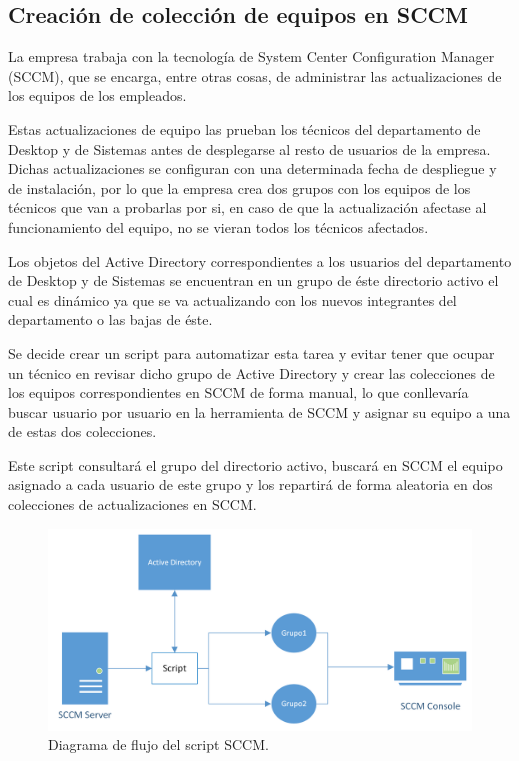 \documentclass[a4paper, 12pt]{book}
\begin{document}
\subsection{Creación de colección de equipos en SCCM}
\label{Creación de colección de equipos en SCCM}

La empresa trabaja con la tecnología de System Center Configuration Manager (SCCM), que se encarga, entre otras cosas, de administrar las actualizaciones de los equipos de los empleados.

Estas actualizaciones de equipo las prueban los técnicos del departamento de Desktop y de Sistemas antes de desplegarse al resto de usuarios de la empresa. Dichas actualizaciones se configuran con una determinada fecha de despliegue y de instalación, por lo que la empresa crea dos grupos con los equipos de los técnicos que van a probarlas por si, en caso de que la actualización afectase al funcionamiento del equipo, no se vieran todos los técnicos afectados.

Los objetos del Active Directory correspondientes a los usuarios del departamento de Desktop y de Sistemas se encuentran en un grupo de éste directorio activo el cual es dinámico ya que se va actualizando con los nuevos integrantes del departamento o las bajas de éste.

Se decide crear un script para automatizar esta tarea y evitar tener que ocupar un técnico en revisar dicho grupo de Active Directory y crear las colecciones de los equipos correspondientes en SCCM de forma manual, lo que conllevaría buscar usuario por usuario en la herramienta de SCCM y asignar su equipo a una de estas dos colecciones.

Este script consultará el grupo del directorio activo, buscará en SCCM el equipo asignado a cada usuario de este grupo y los repartirá de forma aleatoria en dos colecciones de actualizaciones en SCCM.

\begin{figure}[H]
	\centering
	\includegraphics[width=17cm, keepaspectratio]{img/SCCM_diagrama.png}
	\caption{Diagrama de flujo del script SCCM.}
	\label{fig:SCCM_diagrama}
\end{figure}
\end{document}
